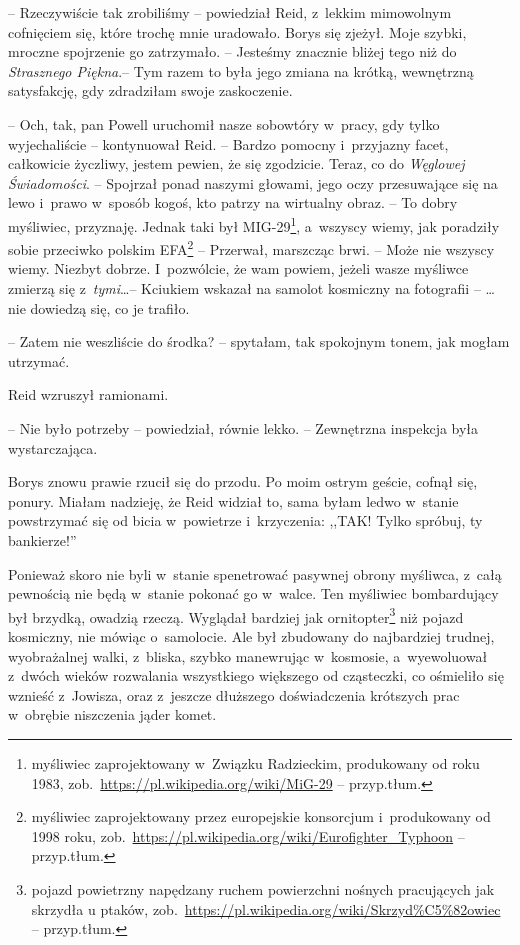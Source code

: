 \documentclass[oneside,polish,11pt,sfheadings]{mwbk}
\begin{document}
-- Rzeczywiście tak zrobiliśmy -- powiedział Reid, z~lekkim mimowolnym
cofnięciem się, które trochę mnie uradowało. Borys się zjeżył. Moje
szybki, mroczne spojrzenie go zatrzymało. -- Jesteśmy znacznie bliżej
tego niż do \textit{Strasznego Piękna}.-- Tym razem to była jego zmiana na
krótką, wewnętrzną satysfakcję, gdy zdradziłam swoje zaskoczenie. 

-- Och, tak, pan Powell uruchomił nasze sobowtóry w~pracy, gdy tylko
wyjechaliście -- kontynuował Reid. -- Bardzo pomocny i~przyjazny facet,
całkowicie życzliwy, jestem pewien, że się zgodzicie. Teraz, co do
\textit{Węglowej Świadomości}. -- Spojrzał ponad naszymi głowami, jego oczy
przesuwające się na lewo i~prawo w~sposób kogoś, kto patrzy na wirtualny
obraz. -- To dobry myśliwiec, przyznaję. Jednak taki był MIG-29\footnote{
myśliwiec zaprojektowany w~Związku Radzieckim, produkowany od roku 1983,
zob.~\url{https://pl.wikipedia.org/wiki/MiG-29} -- przyp.tłum.}, a~wszyscy wiemy, jak poradziły sobie przeciwko polskim
EFA\footnote{ myśliwiec zaprojektowany przez europejskie konsorcjum i~produkowany od 1998 roku,
zob.~\url{https://pl.wikipedia.org/wiki/Eurofighter\_Typhoon}
-- przyp.tłum.} -- Przerwał, marszcząc brwi. -- Może nie wszyscy wiemy.
Niezbyt dobrze. I~pozwólcie, że wam powiem, jeżeli wasze myśliwce
zmierzą się z~\textit{tymi}\ldots  -- Kciukiem wskazał na samolot kosmiczny na
fotografii -- \ldots  nie dowiedzą się, co je trafiło.

-- Zatem nie weszliście do środka? -- spytałam, tak spokojnym tonem, jak
mogłam utrzymać.

Reid wzruszył ramionami. 

-- Nie było potrzeby -- powiedział, równie lekko.
-- Zewnętrzna inspekcja była wystarczająca.

Borys znowu prawie rzucił się do przodu. Po moim ostrym geście, cofnął
się, ponury. Miałam nadzieję, że Reid widział to, sama byłam ledwo w~stanie powstrzymać się od bicia w~powietrze i~krzyczenia: ,,TAK! Tylko
spróbuj, ty bankierze!''

Ponieważ skoro nie byli w~stanie spenetrować pasywnej obrony myśliwca, z~całą pewnością nie będą w~stanie pokonać go w~walce. Ten myśliwiec
bombardujący był brzydką, owadzią rzeczą. Wyglądał bardziej jak
ornitopter\footnote{ pojazd powietrzny napędzany ruchem powierzchni nośnych
pracujących jak skrzydła u ptaków,
zob.~\url{https://pl.wikipedia.org/wiki/Skrzyd\%C5\%82owiec} -- przyp.tłum.} niż pojazd kosmiczny, nie mówiąc o~samolocie. Ale był
zbudowany do najbardziej trudnej, wyobrażalnej walki, z~bliska,
szybko manewrując w~kosmosie, a~wyewoluował z~dwóch wieków rozwalania
wszystkiego większego od cząsteczki, co ośmieliło się wznieść z~Jowisza,
oraz z~jeszcze dłuższego doświadczenia krótszych prac w~obrębie
niszczenia jąder komet.
\end{document}
